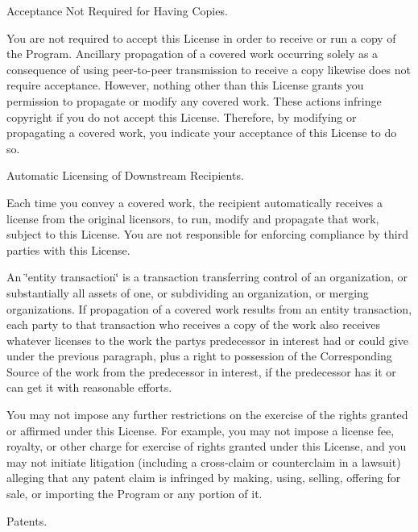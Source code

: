 \begin{DoxyEnumerate}
\item Acceptance Not Required for Having Copies.
\end{DoxyEnumerate}

You are not required to accept this License in order to receive or run a copy of the Program. Ancillary propagation of a covered work occurring solely as a consequence of using peer-\/to-\/peer transmission to receive a copy likewise does not require acceptance. However, nothing other than this License grants you permission to propagate or modify any covered work. These actions infringe copyright if you do not accept this License. Therefore, by modifying or propagating a covered work, you indicate your acceptance of this License to do so.


\begin{DoxyEnumerate}
\item Automatic Licensing of Downstream Recipients.
\end{DoxyEnumerate}

Each time you convey a covered work, the recipient automatically receives a license from the original licensors, to run, modify and propagate that work, subject to this License. You are not responsible for enforcing compliance by third parties with this License.

An \char`\"{}entity transaction\char`\"{} is a transaction transferring control of an organization, or substantially all assets of one, or subdividing an organization, or merging organizations. If propagation of a covered work results from an entity transaction, each party to that transaction who receives a copy of the work also receives whatever licenses to the work the party\textquotesingle{}s predecessor in interest had or could give under the previous paragraph, plus a right to possession of the Corresponding Source of the work from the predecessor in interest, if the predecessor has it or can get it with reasonable efforts.

You may not impose any further restrictions on the exercise of the rights granted or affirmed under this License. For example, you may not impose a license fee, royalty, or other charge for exercise of rights granted under this License, and you may not initiate litigation (including a cross-\/claim or counterclaim in a lawsuit) alleging that any patent claim is infringed by making, using, selling, offering for sale, or importing the Program or any portion of it.


\begin{DoxyEnumerate}
\item Patents.
\end{DoxyEnumerate}

